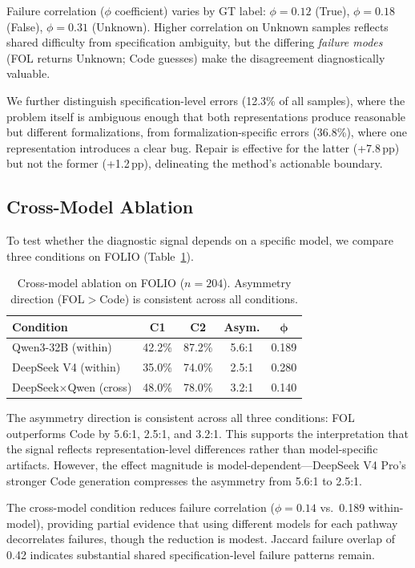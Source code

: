 \documentclass[11pt,a4paper]{article}
\newcommand{\pp}{\,pp}
\begin{document}
Failure correlation ($\phi$ coefficient) varies by GT label: $\phi{=}0.12$ (True), $\phi{=}0.18$ (False), $\phi{=}0.31$ (Unknown).
Higher correlation on Unknown samples reflects shared difficulty from specification ambiguity, but the differing \emph{failure modes} (FOL returns Unknown; Code guesses) make the disagreement diagnostically valuable.

We further distinguish specification-level errors (12.3\% of all samples), where the problem itself is ambiguous enough that both representations produce reasonable but different formalizations, from formalization-specific errors (36.8\%), where one representation introduces a clear bug.
Repair is effective for the latter (+7.8\pp{}) but not the former (+1.2\pp{}), delineating the method's actionable boundary.

\subsection{Cross-Model Ablation}
\label{sec:cross-model}

To test whether the diagnostic signal depends on a specific model, we compare three conditions on FOLIO (Table~\ref{tab:cross-model}).

\begin{table}[t]
\centering
\small
\begin{tabular}{lcccc}
\toprule
\textbf{Condition} & \textbf{C1} & \textbf{C2} & \textbf{Asym.} & $\boldsymbol{\phi}$ \\
\midrule
Qwen3-32B (within) & 42.2\% & 87.2\% & 5.6:1 & 0.189 \\
DeepSeek V4 (within) & 35.0\% & 74.0\% & 2.5:1 & 0.280 \\
DeepSeek$\times$Qwen (cross) & 48.0\% & 78.0\% & 3.2:1 & 0.140 \\
\bottomrule
\end{tabular}
\caption{Cross-model ablation on FOLIO ($n{=}204$). Asymmetry direction (FOL$>$Code) is consistent across all conditions.}
\label{tab:cross-model}
\end{table}

The asymmetry direction is consistent across all three conditions: FOL outperforms Code by 5.6:1, 2.5:1, and 3.2:1.
This supports the interpretation that the signal reflects representation-level differences rather than model-specific artifacts.
However, the effect magnitude is model-dependent---DeepSeek V4 Pro's stronger Code generation compresses the asymmetry from 5.6:1 to 2.5:1.

The cross-model condition reduces failure correlation ($\phi{=}0.14$ vs.\ 0.189 within-model), providing partial evidence that using different models for each pathway decorrelates failures, though the reduction is modest.
Jaccard failure overlap of 0.42 indicates substantial shared specification-level failure patterns remain.
\end{document}
